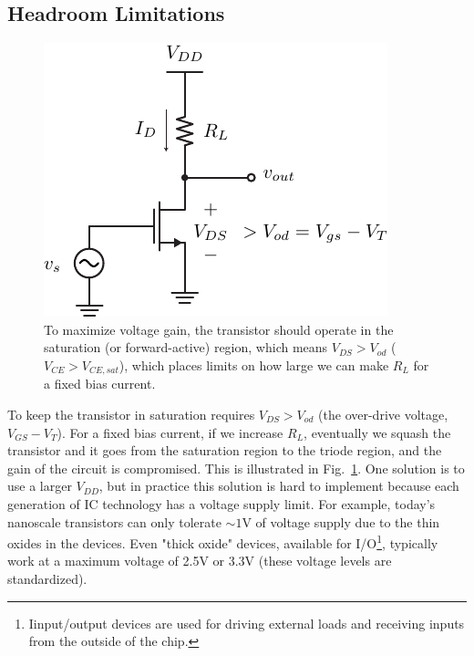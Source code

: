 \subsection{Headroom Limitations}
\begin{figure}[tb]
\centering
\includegraphics[scale=1]{1cs_headroom.pdf}
\caption{To maximize voltage gain, the transistor should operate in the saturation (or forward-active) region, which means $V_{DS} > V_{od}$ ($V_{CE} > V_{CE,sat}$), which places limits on how large we can make $R_L$ for a fixed bias current.}
\label{fig:1cs_headroom.pdf}
\end{figure}
To keep the transistor in saturation requires $V_{DS} > V_{od}$ (the over-drive voltage, $V_{GS} - V_T$).  For a fixed bias current, if we increase $R_L$, eventually we squash the transistor and it goes from the saturation region to the triode region, and the gain of the circuit is compromised.  This is illustrated in Fig.~\ref{fig:1cs_headroom.pdf}.  One solution is to use a larger $V_{DD}$, but in practice this solution is hard to implement because each generation of IC technology has a voltage supply limit.  For example, today's nanoscale transistors can only tolerate $\sim 1$V of voltage supply due to the thin oxides in the devices.  Even "thick oxide" devices, available for I/O\footnote{Iinput/output devices are used for driving external loads and receiving inputs from the outside of the chip.}, typically work at a maximum voltage of 2.5V or 3.3V (these voltage levels are standardized).
